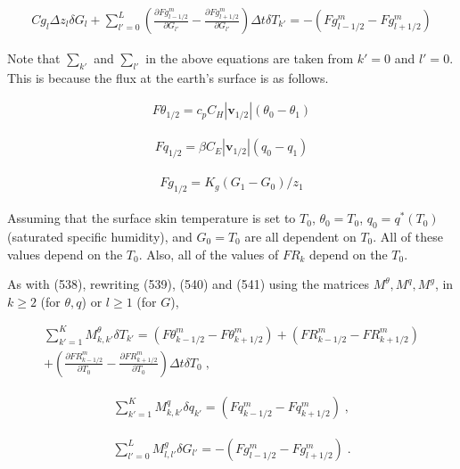 \begin{eqnarray}
  Cg_l \Delta z_l \delta G_l
  +  \sum_{l'=0}^{L} \left(  \frac{\partial{Fg^{m}_{l-1/2}}}{\partial {G_{l'}}}
                            - \frac{\partial{Fg^{m}_{l+1/2}}}{\partial {G_{l'}}} \right)
                 \Delta t\delta T_{k'}
  = - ( Fg^{m}_{l-1/2} - Fg^{m}_{l+1/2} )
\end{eqnarray}

Note that \(\sum_{k'}\) and \(\sum_{l'}\) in the above equations are taken from \(k'=0\) and \(l'=0\). This is because the flux at the earth's surface is as follows.

\begin{eqnarray}
  F\theta_{1/2} =  c_p C_H |{\mathbf{v}}_{1/2}| (\theta_0 - \theta_1)
\end{eqnarray}

\begin{eqnarray}
  Fq_{1/2} =  \beta C_E |{\mathbf{v}}_{1/2}| (q_0 - q_1)
\end{eqnarray}

\begin{eqnarray}
  Fg_{1/2} =  K_g (G_1 - G_0)/z_1
\end{eqnarray}

Assuming that the surface skin temperature is set to \(T_0\), \(\theta_0 = T_0\), \(q_0 = q^*(T_0)\) (saturated specific humidity), and \(G_0 = T_0\) are all dependent on \(T_0\). All of these values
depend on the \(T_0\). Also, all of the values of \(FR_{k}\) depend on the \(T_0\).

As with (538), rewriting (539), (540) and (541) using the matrices \(M^{\theta}, M^q, M^g\), in \(k \ge 2\) (for \(\theta, q\)) or \(l \ge 1\) (for \(G\)),

\begin{eqnarray}
    \sum_{k'=1}^{K}  M^\theta_{k,k'} \delta T_{k'}
        =  (F\theta^{m}_{k-1/2} - F\theta^{m}_{k+1/2})
        + (FR^{m}_{k-1/2} - FR^{m}_{k+1/2})   \\
 +  \left(\frac{\partial{FR^{m}_{k-1/2}}}{\partial {T_0}} - \frac{\partial{FR^{m}_{k+1/2}}}{\partial {T_0}} \right)
     \Delta t\delta T_0 \; ,
\end{eqnarray}

\begin{eqnarray}
 \sum_{k'=1}^{K}  M^q_{k,k'} \delta q_{k'}
         = (Fq^{m}_{k-1/2} - Fq^{m}_{k+1/2}) \; ,
\end{eqnarray}

\begin{eqnarray}
  \sum_{l'=0}^{L} M^g_{l,l'} \delta G_{l'}
         = - (Fg^{m}_{l-1/2} - Fg^{m}_{l+1/2}) \; .
\end{eqnarray}

